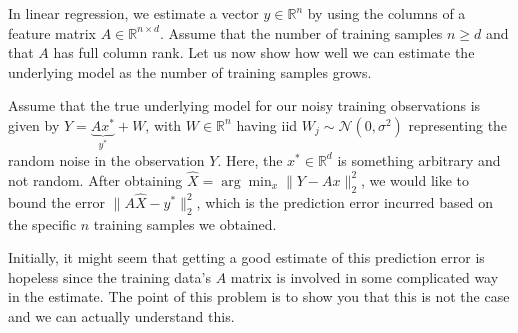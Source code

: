 In linear regression, we estimate a vector $y \in \mathbb{R}^n$ by
using the columns of a feature matrix $A \in \mathbb{R}^{n \times
  d}$. Assume that the number of training samples $n \geq d$ and that
$A$ has full column rank. Let us now show how well we can estimate the
underlying model as the number of training samples grows.

Assume that the true underlying model for our noisy training
observations is given by $Y = \underbrace{Ax^*}_{y^*} + W$, with $W
\in \mathbb{R}^n$ having iid $W_j \sim \mathcal{N}(0,\sigma^2)$
representing the random noise in the observation $Y$. Here, the $x^*
\in \mathbb{R}^d $ is something arbitrary and not random. After obtaining $\hat{X} = \arg\min_x \| Y - A
x\|_2^2$, we would like to bound the error $\| A \hat{X} - y^*
\|_2^2$, which is the prediction error incurred based on the specific
$n$ training samples we obtained. 

Initially, it might seem that getting a good estimate of this
prediction error is hopeless since the training data's $A$ matrix is
involved in some complicated way in the estimate. The point of this
problem is to show you that this is not the case and we can actually
understand this. 

